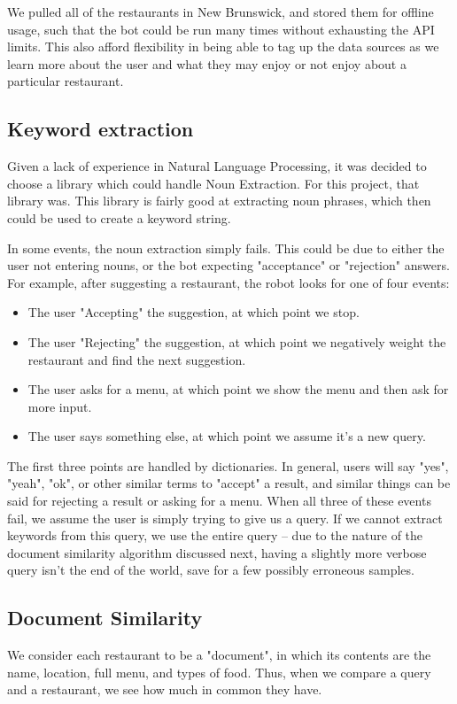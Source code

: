 \documentclass{article}
\begin{document}
        We pulled all of the restaurants in New Brunswick, and stored them for offline usage, such that the bot could be run many times without exhausting the API limits. This also afford flexibility in being able to tag up the data sources as we learn more about the user and what they may enjoy or not enjoy about a particular restaurant.
        
    \subsection{Keyword extraction}
        Given a lack of experience in Natural Language Processing, it was decided to choose a library which could handle Noun Extraction. For this project, that library was. This library is fairly good at extracting noun phrases, which then could be used to create a keyword string.
        
        In some events, the noun extraction simply fails. This could be due to either the user not entering nouns, or the bot expecting "acceptance" or "rejection" answers. For example, after suggesting a restaurant, the robot looks for one of four events:
        
        \begin{itemize}
            \item The user "Accepting" the suggestion, at which point we stop.
            \item The user "Rejecting" the suggestion, at which point we negatively weight the restaurant and find the next suggestion.
            \item The user asks for a menu, at which point we show the menu and then ask for more input.
            \item The user says something else, at which point we assume it's a new query.
        \end{itemize}
        
        The first three points are handled by dictionaries. In general, users will say "yes", "yeah", "ok", or other similar terms to "accept" a result, and similar things can be said for rejecting a result or asking for a menu. When all three of these events fail, we assume the user is simply trying to give us a query. If we cannot extract keywords from this query, we use the entire query -- due to the nature of the document similarity algorithm discussed next, having a slightly more verbose query isn't the end of the world, save for a few possibly erroneous samples.
        
    \subsection{Document Similarity}
        We consider each restaurant to be a "document", in which its contents are the name, location, full menu, and types of food. Thus, when we compare a query and a restaurant, we see how much in common they have.
        
\end{document}
